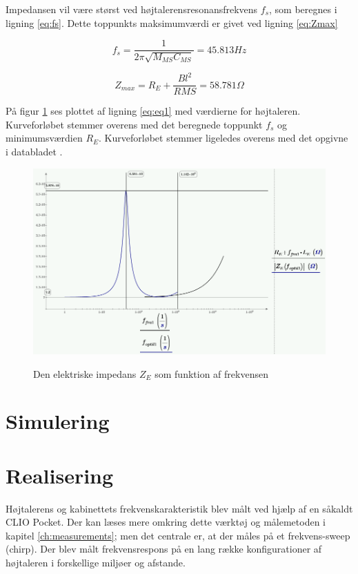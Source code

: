 Impedansen vil være størst ved højtalerensresonansfrekvens $f_s$, som beregnes i ligning \ref{eq:fs}. Dette toppunkts maksimumværdi er givet ved ligning \ref{eq:Zmax} 

\begin{equation}\label{eq:fs}
f_s=\frac{1}{2 \pi \sqrt{M_{MS} C_{MS}}}=45.813Hz
\end{equation}

\begin{equation}\label{eq:Zmax}
Z_{max}=R_E+\frac{Bl^2}{R{MS}}=58.781\Omega
\end{equation}

På figur \ref{fig:ZE_graf}  ses plottet af ligning \ref{eq:eq1} med værdierne for højtaleren. Kurveforløbet stemmer overens med det beregnede toppunkt $f_s$ og minimumsværdien $R_E$. Kurveforløbet stemmer ligeledes overens med det opgivne i databladet \citep{FW168}.

\begin{figure}[H]
	\centering
	\includegraphics[width=\textwidth]{Pics/ZE_graf.PNG}
	\label{fig:ZE_graf}
	\caption{Den elektriske impedans $Z_E$ som funktion af frekvensen} 
\end{figure}

\section{Simulering}

\newpage
\section{Realisering}
Højtalerens og kabinettets frekvenskarakteristik blev målt ved hjælp af en såkaldt CLIO Pocket. Der kan læses mere omkring dette værktøj og målemetoden i kapitel \ref{ch:measurements}; men det centrale er, at der måles på et frekvens-sweep (chirp). Der blev målt frekvensrespons på en lang række konfigurationer af højtaleren i forskellige miljøer og afstande.

